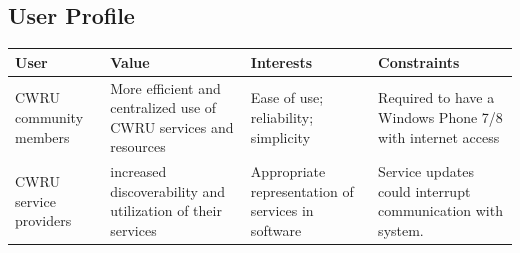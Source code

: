 \documentclass[pdftex,12pt,letter]{article}
\begin{document}
\subsection{User Profile}
\begin{table}[h]
\begin{tabularx}{\textwidth}[t]{|Y|Y|Y|Y|}
\hline
\bfseries User & \bfseries Value & \bfseries Interests & \bfseries Constraints\\ \hline
CWRU community members & More efficient and centralized use of CWRU services and resources & Ease of use; reliability; simplicity & Required to have a Windows Phone 7/8 with internet access \\ \hline
CWRU service providers & increased discoverability and utilization of their services & Appropriate representation of services in software & Service updates could interrupt communication with system. \\ \hline
\end{tabularx}
\end{table}

\end{document}
